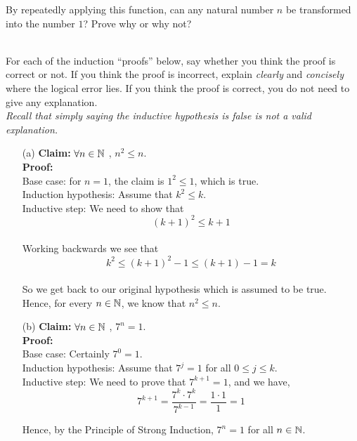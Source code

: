 \documentclass[11pt]{article}
\newif\ifsolutions
\begin{document}
\begin{qunlist}
\begin{itemize}
By repeatedly applying this function, can any natural number $n$ be transformed into the number $1$?  
Prove why or why not?
\end{itemize}

\ifsolutions
\textbf{Solutions:}
\fi



 \\
For each of the induction ``proofs'' below, say whether you think the proof is correct or not.
If you think the proof is incorrect, explain \textit{clearly} and \textit{concisely} where the logical error lies.
If you think the proof is correct, you do not need to give any explanation. \\
\textit{Recall that simply saying the inductive hypothesis is false is not a valid explanation.}

\begin{itemize}
\item[(a)] \textbf{Claim:} $\forall n \in \mathbb{N}$ , $n^2 \leq n$. \\
\textbf{Proof:} \\
Base case: for $n = 1$, the claim is $1^2 \leq 1$, which is true. \\
Induction hypothesis: Assume that $k^2 \leq k$. \\
Inductive step: We need to show that \[ (k+1)^2 \leq k+1\] \\
Working backwards we see that \[ k^2 \leq (k+1)^2 - 1 \leq (k+1) - 1 = k \] \\
So we get back to our original hypothesis which is assumed to be true.\\
Hence, for every $n \in \mathbb{N}$, we know that $n^2 \leq n$. 

\ifsolutions
\textbf{Solutions:}
\fi


\item[(b)]\textbf{Claim:} $\forall n \in \mathbb{N}$ , $7^n = 1$. \\
\textbf{Proof:} \\
Base case: Certainly $7^0 = 1$. \\
Induction hypothesis: Assume that $7^j = 1$ for all $0\leq j \leq k$.\\
Inductive step: We need to prove that $7^{k+1} = 1$, and we have,
\[ 7^{k+1} = \frac{7^k \cdot 7^k}{7^{k-1}} = \frac{1 \cdot 1}{1} = 1\]

Hence, by the Principle of Strong Induction, $7^n = 1$ for all $n \in \mathbb{N}$.

\ifsolutions
\textbf{Solutions:}
\fi



\end{itemize}
\end{qunlist}
\end{document}
